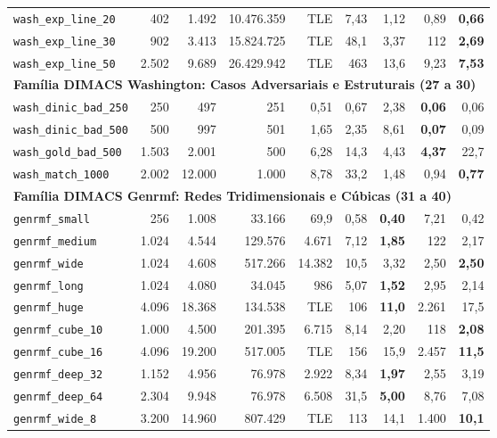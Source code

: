 \documentclass[12pt,a4paper]{article}
\begin{document}
\begin{longtable}{lrrrrrrrr}
\texttt{wash\_exp\_line\_20} & 402 & 1.492 & 10.476.359 & TLE & 7,43 & 1,12 & 0,89 & \textbf{0,66} \\
\texttt{wash\_exp\_line\_30} & 902 & 3.413 & 15.824.725 & TLE & 48,1 & 3,37 & 112 & \textbf{2,69} \\
\texttt{wash\_exp\_line\_50} & 2.502 & 9.689 & 26.429.942 & TLE & 463 & 13,6 & 9,23 & \textbf{7,53} \\
\midrule
\multicolumn{9}{l}{\textbf{Família DIMACS Washington: Casos Adversariais e Estruturais (27 a 30)}} \\
\midrule
\texttt{wash\_dinic\_bad\_250} & 250 & 497 & 251 & 0,51 & 0,67 & 2,38 & \textbf{0,06} & 0,06 \\
\texttt{wash\_dinic\_bad\_500} & 500 & 997 & 501 & 1,65 & 2,35 & 8,61 & \textbf{0,07} & 0,09 \\
\texttt{wash\_gold\_bad\_500} & 1.503 & 2.001 & 500 & 6,28 & 14,3 & 4,43 & \textbf{4,37} & 22,7 \\
\texttt{wash\_match\_1000} & 2.002 & 12.000 & 1.000 & 8,78 & 33,2 & 1,48 & 0,94 & \textbf{0,77} \\
\midrule
\multicolumn{9}{l}{\textbf{Família DIMACS Genrmf: Redes Tridimensionais e Cúbicas (31 a 40)}} \\
\midrule
\texttt{genrmf\_small} & 256 & 1.008 & 33.166 & 69,9 & 0,58 & \textbf{0,40} & 7,21 & 0,42 \\
\texttt{genrmf\_medium} & 1.024 & 4.544 & 129.576 & 4.671 & 7,12 & \textbf{1,85} & 122 & 2,17 \\
\texttt{genrmf\_wide} & 1.024 & 4.608 & 517.266 & 14.382 & 10,5 & 3,32 & 2,50 & \textbf{2,50} \\
\texttt{genrmf\_long} & 1.024 & 4.080 & 34.045 & 986 & 5,07 & \textbf{1,52} & 2,95 & 2,14 \\
\texttt{genrmf\_huge} & 4.096 & 18.368 & 134.538 & TLE & 106 & \textbf{11,0} & 2.261 & 17,5 \\
\texttt{genrmf\_cube\_10} & 1.000 & 4.500 & 201.395 & 6.715 & 8,14 & 2,20 & 118 & \textbf{2,08} \\
\texttt{genrmf\_cube\_16} & 4.096 & 19.200 & 517.005 & TLE & 156 & 15,9 & 2.457 & \textbf{11,5} \\
\texttt{genrmf\_deep\_32} & 1.152 & 4.956 & 76.978 & 2.922 & 8,34 & \textbf{1,97} & 2,55 & 3,19 \\
\texttt{genrmf\_deep\_64} & 2.304 & 9.948 & 76.978 & 6.508 & 31,5 & \textbf{5,00} & 8,76 & 7,08 \\
\texttt{genrmf\_wide\_8} & 3.200 & 14.960 & 807.429 & TLE & 113 & 14,1 & 1.400 & \textbf{10,1} \\
\bottomrule
\end{longtable}
\endgroup
\end{document}
